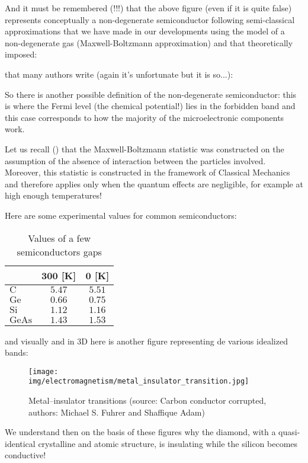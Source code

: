 	And it must be remembered (!!!) that the above figure (even if it is quite false) represents conceptually a non-degenerate semiconductor following semi-classical approximations that we have made in our developments using the model of a non-degenerate gas (Maxwell-Boltzmann approximation) and that theoretically imposed:
	
	that many authors write (again it's unfortunate but it is so...):
	 
	So there is another possible definition of the non-degenerate semiconductor: this is where the Fermi level (the chemical potential!) lies in the forbidden band and this case corresponds to how the majority of the microelectronic components work.
	
	\begin{tcolorbox}[title=Remark,colframe=black,arc=10pt]
	Let us recall () that the Maxwell-Boltzmann statistic was constructed on the assumption of the absence of interaction between the particles involved. Moreover, this statistic is constructed in the framework of Classical Mechanics and therefore applies only when the quantum effects are negligible, for example at high enough temperatures!
	\end{tcolorbox}
	Here are some experimental values for common semiconductors:
	\begin{table}[H]
		\centering
		\begin{tabular}{|l|c|c|}
		\hline
		\rowcolor[HTML]{9B9B9B} 
		\multicolumn{1}{|c|}{\cellcolor[HTML]{9B9B9B}\textbf{$\pmb{E_g}$ {[}eV{]}}} & \textbf{$\pmb{300}$ {[}K{]}} & \textbf{$\pmb{0}$ {[}K{]}} \\ \hline
		$\mathrm{C}$ & $5.47$ & $5.51$ \\ \hline
		$\mathrm{Ge}$ & $0.66$ & $0.75$ \\ \hline
		$\mathrm{Si}$ & $1.12$ & $1.16$ \\ \hline
		$\mathrm{GeAs}$ & $1.43$ & $1.53$ \\ \hline
		\end{tabular}
		\caption{Values of a few semiconductors gaps}
	\end{table}
	and visually and in 3D here is another figure representing de various idealized bands:
	\begin{figure}[H]
		\centering
		\texttt{[image: img/electromagnetism/metal\_insulator\_transition.jpg]}
		\caption[Metal–insulator transitions]{Metal–insulator transitions (source: Carbon conductor corrupted, authors: Michael S. Fuhrer and Shaffique Adam)}
	\end{figure}
	We understand then on the basis of these figures why the diamond, with a quasi-identical crystalline and atomic structure, is insulating while the silicon becomes conductive!

